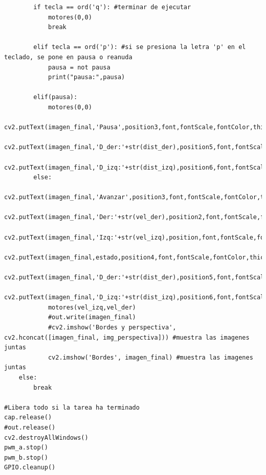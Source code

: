 \documentclass[11pt,a4paper]{article}
\begin{document}
\begin{lstlisting}
		if tecla == ord('q'): #terminar de ejecutar
			motores(0,0)
			break
		
		elif tecla == ord('p'): #si se presiona la letra 'p' en el teclado, se pone en pausa o reanuda
			pausa = not pausa
			print("pausa:",pausa)
		
		elif(pausa):
			motores(0,0)
			cv2.putText(imagen_final,'Pausa',position3,font,fontScale,fontColor,thick)
			cv2.putText(imagen_final,'D_der:'+str(dist_der),position5,font,fontScale,fontColor,thick)
			cv2.putText(imagen_final,'D_izq:'+str(dist_izq),position6,font,fontScale,fontColor,thick)
		else:
			cv2.putText(imagen_final,'Avanzar',position3,font,fontScale,fontColor,thick)
			cv2.putText(imagen_final,'Der:'+str(vel_der),position2,font,fontScale,fontColor,thick)
			cv2.putText(imagen_final,'Izq:'+str(vel_izq),position,font,fontScale,fontColor,thick)
			cv2.putText(imagen_final,estado,position4,font,fontScale,fontColor,thick)
			cv2.putText(imagen_final,'D_der:'+str(dist_der),position5,font,fontScale,fontColor,thick)
			cv2.putText(imagen_final,'D_izq:'+str(dist_izq),position6,font,fontScale,fontColor,thick)
			motores(vel_izq,vel_der)
			#out.write(imagen_final)
			#cv2.imshow('Bordes y perspectiva', cv2.hconcat([imagen_final, img_perspectiva])) #muestra las imagenes juntas
			cv2.imshow('Bordes', imagen_final) #muestra las imagenes juntas        
	else:
		break

#Libera todo si la tarea ha terminado
cap.release()
#out.release()
cv2.destroyAllWindows() 
pwm_a.stop()
pwm_b.stop()
GPIO.cleanup()
	\end{lstlisting}
	
\end{document}

